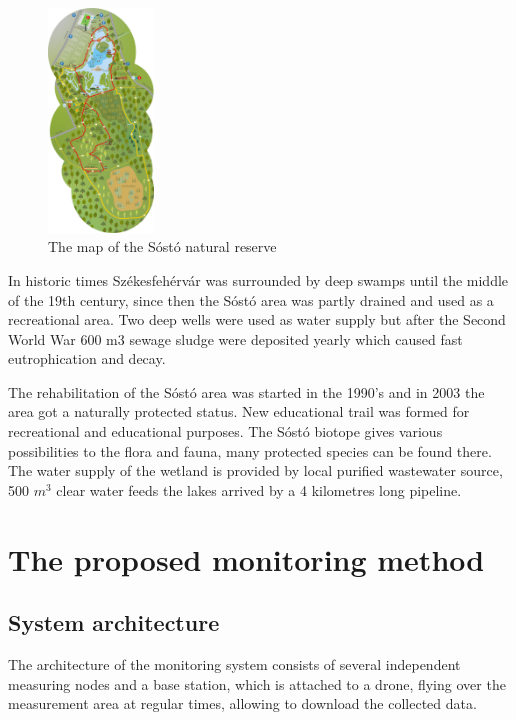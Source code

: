 \documentclass[conference]{IEEEtran}
\begin{document}
\begin{figure}[htbp]
	\centering
	\includegraphics[width=0.25\textwidth]{fig/map1.png}
  \caption{The map of the Sóstó natural reserve}
	\label{fig-map1}
\end{figure}

In historic times Székesfehérvár was surrounded by deep swamps until the middle
of the 19th century, since then the Sóstó area was partly drained and used as a
recreational area. Two deep wells were used as water supply but after the
Second World War 600 m3 sewage sludge were deposited yearly which caused fast
eutrophication and decay.

The rehabilitation of the Sóstó area was started in the 1990’s and in 2003 the
area got a naturally protected status. New educational trail was formed for
recreational and educational purposes. The Sóstó biotope gives various
possibilities to the flora and fauna, many protected species can be found
there. The water supply of the wetland is provided by local purified wastewater
source, 500 $m^3$ clear water feeds the lakes arrived by a 4 kilometres long
pipeline.


\section{The proposed monitoring method}

\subsection{System architecture}

The architecture of the monitoring system consists of several independent
measuring nodes and a base station, which is attached to a drone, flying
over the measurement area at regular times, allowing to download the
collected data.
\end{document}
